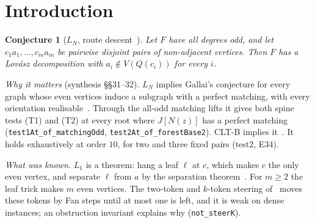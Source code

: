 \documentclass[11pt]{amsart}
\newtheorem{conjecture}[theorem]{Conjecture}
\theoremstyle{definition}
\begin{document}
\section{Introduction}\label{sec:intro}

\begin{conjecture}[$L_N$, route descent~\cite{RD}]\label{conj:LN}
Let $F$ have all degrees odd, and let $c_1a_1,\dots,c_ma_m$ be pairwise disjoint pairs of
non-adjacent vertices. Then $F$ has a Lov\'asz decomposition with $a_i\notin V(Q(c_i))$ for every
$i$.
\end{conjecture}

\emph{Why it matters} (synthesis \S\S31--32). $L_N$ implies Gallai's conjecture for every graph whose
even vertices induce a subgraph with a perfect matching, with every orientation realisable~\cite{RD}.
Through the all-odd matching lifts it gives both spine tests (T1) and (T2) at every root where
$J[N(z)]$ has a perfect matching (\texttt{test1At\_of\_matchingOdd},
\texttt{test2At\_of\_forestBase2}). CLT-B implies it~\cite{CLT}. It holds exhaustively at order
$10$, for two and three fixed pairs (test2, E34).

\emph{What was known.} $L_1$ is a theorem: hang a leaf $\ell$ at $c$, which makes $c$ the only even
vertex, and separate $\ell$ from $a$ by the separation theorem~\cite{RD}. For $m\ge2$ the leaf trick
makes $m$ even vertices. The two-token and $k$-token steering of~\cite{TRN,MT} moves these tokens by
Fan steps until at most one is left, and it is weak on dense instances; an obstruction invariant
explains why (\texttt{not\_steerK}).
\end{document}
